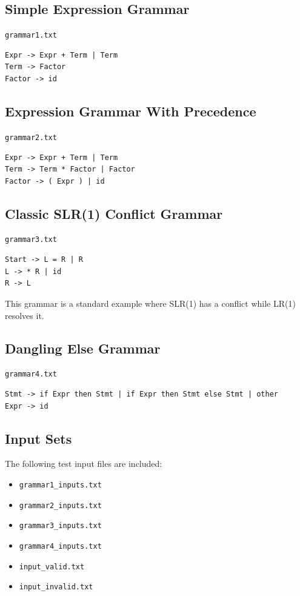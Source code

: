 \documentclass[12pt]{article}
\begin{document}
\subsection{Simple Expression Grammar}
\texttt{grammar1.txt}
\begin{lstlisting}[style=reportstyle]
Expr -> Expr + Term | Term
Term -> Factor
Factor -> id
\end{lstlisting}

\subsection{Expression Grammar With Precedence}
\texttt{grammar2.txt}
\begin{lstlisting}[style=reportstyle]
Expr -> Expr + Term | Term
Term -> Term * Factor | Factor
Factor -> ( Expr ) | id
\end{lstlisting}

\subsection{Classic SLR(1) Conflict Grammar}
\texttt{grammar3.txt}
\begin{lstlisting}[style=reportstyle]
Start -> L = R | R
L -> * R | id
R -> L
\end{lstlisting}

This grammar is a standard example where SLR(1) has a conflict while LR(1) resolves it.

\subsection{Dangling Else Grammar}
\texttt{grammar4.txt}
\begin{lstlisting}[style=reportstyle]
Stmt -> if Expr then Stmt | if Expr then Stmt else Stmt | other
Expr -> id
\end{lstlisting}

\subsection{Input Sets}
The following test input files are included:
\begin{itemize}[leftmargin=1.5em]
    \item \texttt{grammar1_inputs.txt}
    \item \texttt{grammar2_inputs.txt}
    \item \texttt{grammar3_inputs.txt}
    \item \texttt{grammar4_inputs.txt}
    \item \texttt{input_valid.txt}
    \item \texttt{input_invalid.txt}
\end{itemize}
\end{document}
